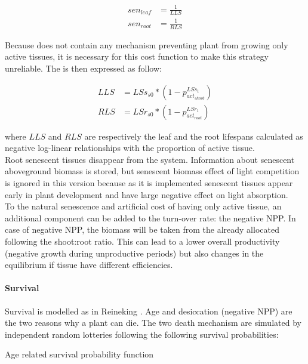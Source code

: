 \begin{align}
sen_{leaf} &= \frac{1}{LLS}\\
sen_{root} &= \frac{1}{RLS}
\end{align}

Because \model does not contain any mechanism preventing plant from growing only  active tissues, it is necessary for this cost function to make this strategy unreliable. The is then expressed as follow:

\begin{align}
LLS &= LSs_{s0} * (1- p_{act_{shoot}}^{LSs_{1}}) \\
RLS &= LSr_{s0} * (1- p_{act_{root}}^{LSr_{1}})
\end{align}


where $LLS$ and $RLS$ are respectively the leaf and the root lifespans calculated as negative log-linear relationships with the proportion of active tissue.\\
\indent Root senescent tissues disappear from the system. Information about senescent aboveground biomass is stored, but senescent biomass effect of light competition is ignored in this version because as it is implemented senescent tissues appear early in plant development and have large negative effect on light absorption.\\
\indent To the natural senescence and artificial cost of having only active tissue, an additional component can be added to the turn-over rate: the negative NPP. In case of negative NPP, the biomass will be taken from the already allocated following the shoot:root ratio. This can lead to a lower overall productivity (negative growth during unproductive periods) but also changes in the equilibrium if tissue have different efficiencies.\\

\paragraph{Survival} Survival is modelled as in Reineking \parencite{reineking_environmental_2006}. Age and desiccation (negative NPP) are the two reasons why a plant can die. The two death mechanism are simulated by independent random lotteries following the following survival probabilities:

\begin{marginfigure}[-4pt]
\label{fig:derivaives}
\caption{Age related survival probability function}
\end{marginfigure}

